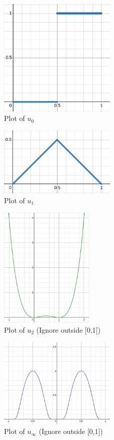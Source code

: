 \documentclass{article}
\begin{document}
\begin{figure}[ht]
\caption{Plot of $u_0$}
\centering
\includegraphics[width=0.5\textwidth]{u_0.png}
\end{figure}
\begin{figure}[ht]
\caption{Plot of $u_1$}
\centering
\includegraphics[width=0.5\textwidth]{u_1.png}
\end{figure}
\begin{figure}[ht]
\caption{Plot of $u_2$ (Ignore outside [0,1])}
\centering
\includegraphics[width=0.4\textwidth]{u_2.png}
\end{figure}
\begin{figure}[ht]
\caption{Plot of $u_\infty$ (Ignore outside [0,1])}
\centering
\includegraphics[width=0.5\textwidth]{u_inf.png}
\end{figure}
\newpage
\end{document}
